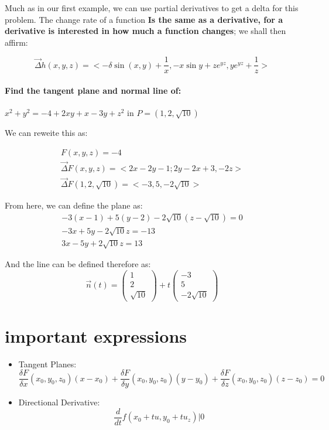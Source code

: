 \documentclass[11pt,fleqn]{book} %
\begin{document}
Much as in our first example, we can use partial derivatives to get a delta for this problem.
The change rate of a function \textbf{Is the same as a derivative, for a derivative is interested in
how much a function changes}; we shall then affirm:

\begin{equation}
    \vec{\Delta}h(x,y,z) = <-\delta \sin(x,y) + \frac{1}{x}, - x \sin y +ze^{yz}, ye^{yz} + \frac{1}{z} >
\end{equation}

\paragraph*{Find the tangent plane and normal line of:}
$x^2 + y^2 = -4+2xy + x - 3y + z^2$ in $P=(1,2,\sqrt{10})$

We can reweite this as: 

\begin{gather}
    F(x,y,z) = -4 \\
    \vec{\Delta} F (x,y,z) = <2x-2y-1; 2y - 2x + 3, -2z > \\
    \vec{\Delta} F(1,2,\sqrt{10}) = <-3,5,-2 \sqrt{10}>
\end{gather}

From here, we can define the plane as:
\begin{gather}
    -3(x-1) + 5(y-2) - 2 \sqrt{10}(z-\sqrt{10}) = 0 \\
    -3x + 5y - 2\sqrt{10} z = -13 \\
    3x - 5y + 2\sqrt{10} z = 13
\end{gather}

And the line can be defined therefore as:
\begin{equation}
    \vec{n}(t) = \begin{pmatrix}
        1 \\
        2\\
        \sqrt{10}
    \end{pmatrix} + t \begin{pmatrix}
        -3 \\
        5 \\
        -2 \sqrt{10}
    \end{pmatrix}
\end{equation}

\section{important expressions}
\begin{itemize}
    \item Tangent Planes:
    \begin{equation}
        \frac{\delta F}{\delta x}(x_0,y_0,z_0)(x-x_0) + \frac{\delta F}{\delta y}(x_0,y_0,z_0)(y-y_0) + \frac{\delta F}{\delta z}(x_0,y_0,z_0)(z-z_0) = 0 
    \end{equation}
    \item Directional Derivative:
    \begin{equation}
        \frac{d}{dt}f(x_0+tu,y_0+tu_z) | 0
    \end{equation}
\end{itemize}
\end{document}
